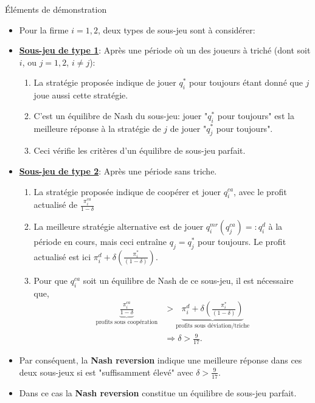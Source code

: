 \begin{frame}[allowframebreaks]{Éléments de démonstration}
\begin{itemize}
    \item Pour la firme $i=1, 2$, deux types de sous-jeu sont à considérer:
    \item \textbf{\underline{Sous-jeu de type 1}}:
    Après une période où un des joueurs à triché (dont soit $i$, ou $j=1, 2$, $i\neq j$):
    \begin{enumerate}[-]
        \item La stratégie proposée indique de jouer $q_i^*$ pour toujours étant donné que $j$ joue aussi 
        cette stratégie.  
        \item C'est un équilibre de Nash du sous-jeu: jouer "$q_i^*$ pour toujours" est la meilleure 
        réponse à la stratégie de $j$ de jouer "$q_j^*$ pour toujours".
        \item Ceci vérifie les critères d'un équilibre de sous-jeu parfait.
    \end{enumerate}
    \framebreak
    \item \textbf{\underline{Sous-jeu de type 2}}: Après une période sans triche.
    \begin{enumerate}[-]
        \item La stratégie proposée indique de coopérer et jouer $q_i^{ca}$, avec le profit actualisé de $\frac{\pi_i^{ca}}{1-\delta}$
        \item La meilleure stratégie alternative est de jouer $q_i^{mr}(q_j^{ca}) =: q_i^d$ à la période en cours,
         mais ceci entraîne $q_j =  q_j^*$ pour toujours. Le profit actualisé est ici 
         $\pi^d_i + \delta\left(\frac{\pi_i^*}{(1-\delta)}\right)$.
         \item Pour que $q_i^{ca}$ soit un équilibre de Nash de ce sous-jeu, il est nécessaire que,
         \begin{align*}
            \underbrace{\frac{\pi_i^{ca}}{1-\delta}}_{\text{profits sous coopération}} &> \underbrace{\pi^d_i + \delta\left(\frac{\pi_i^*}{(1-\delta)}\right)}_{\text{profits sous déviation/triche}}\\
            &\Rightarrow \delta >\frac{9}{17}.
         \end{align*}
    \end{enumerate}
    \item Par conséquent, la \textbf{Nash reversion} indique une meilleure réponse dans ces deux sous-jeux 
    si est "suffisamment élevé" avec $\delta >\frac{9}{17}$. 
    \item Dans ce cas la \textbf{Nash reversion} constitue un équilibre de sous-jeu parfait.
\end{itemize}
\end{frame}
